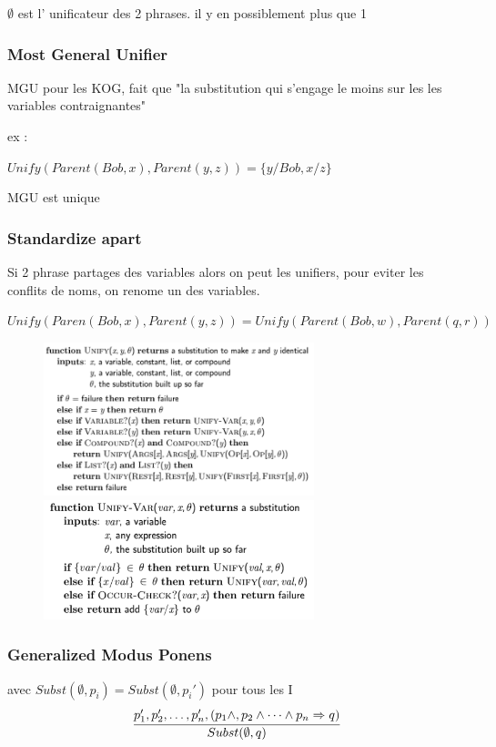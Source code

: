 \documentclass[12pt]{article}
\begin{document}
		$\emptyset$ est l' unificateur des 2 phrases. il y en possiblement plus que 1
		
		\subsubsection{Most General Unifier}
			MGU pour les KOG, fait que "la substitution qui s'engage le moins sur les les variables contraignantes"
			
			ex : 
			
			$Unify(Parent(Bob,x),Parent(y,z)) = \{y/Bob, x/z\}$
			
			MGU est unique
			
		
		\subsubsection{Standardize apart}
			Si 2 phrase partages des variables alors on peut les unifiers, pour eviter les conflits de noms, on renome un des variables.
			
			$Unify(Paren(Bob,x), Parent(y,z)) = Unify(Parent(Bob,w), Parent(q,r))$
		
			\begin{figure}[htp]	
				\centering
				\includegraphics[width=0.7\textwidth]{img/Unification.png}
				\includegraphics[width=0.7\textwidth]{img/Unification1.png}
			\end{figure}
			
		\subsubsection{Generalized Modus Ponens}
			avec $Subst(\emptyset, p_i) = Subst(\emptyset,p_i')$ pour tous les I
			\begin{equation}
				\cfrac{p_1', p_2',\dots,p_n',(p_1 \land,p_2 \land \dots \land p_n \Rightarrow q)}{Subst(\emptyset, q)}
			\end{equation}
			
\end{document}
